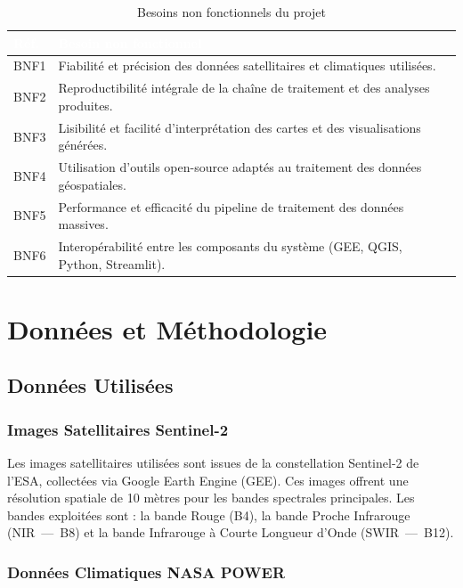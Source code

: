 \documentclass[12pt,a4paper]{report}
\begin{document}
\begin{table}[H]
\centering
{}
\begin{tabularx}{\textwidth}{C{1.2cm} X}
\toprule
{}
\textcolor{white}{\textbf{Réf.}} & \textcolor{white}{\textbf{Besoin non fonctionnel}} \\
\midrule
BNF1 & Fiabilité et précision des données satellitaires et climatiques utilisées. \\
BNF2 & Reproductibilité intégrale de la chaîne de traitement et des analyses produites. \\
BNF3 & Lisibilité et facilité d'interprétation des cartes et des visualisations générées. \\
BNF4 & Utilisation d'outils open-source adaptés au traitement des données géospatiales. \\
BNF5 & Performance et efficacité du pipeline de traitement des données massives. \\
BNF6 & Interopérabilité entre les composants du système (GEE, QGIS, Python, Streamlit). \\
\bottomrule
\end{tabularx}
\caption{Besoins non fonctionnels du projet}
\label{tab:bnf}
\end{table}

\section{Données et Méthodologie}

\subsection{Données Utilisées}

\subsubsection{Images Satellitaires Sentinel-2}

Les images satellitaires utilisées sont issues de la constellation Sentinel-2 de l'ESA, collectées via Google Earth Engine (GEE). Ces images offrent une résolution spatiale de 10 mètres pour les bandes spectrales principales. Les bandes exploitées sont : la bande Rouge (B4), la bande Proche Infrarouge (NIR~---~B8) et la bande Infrarouge à Courte Longueur d'Onde (SWIR~---~B12).

\subsubsection{Données Climatiques NASA POWER}
\end{document}
